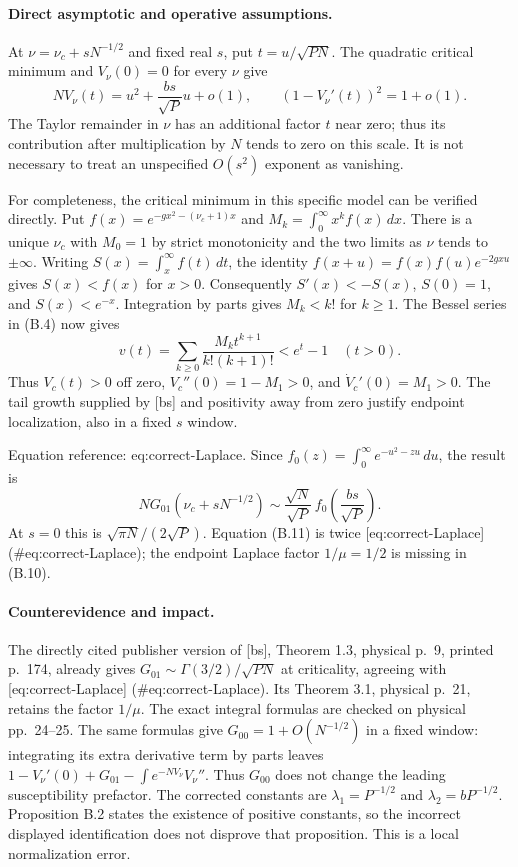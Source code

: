 \documentclass[10pt]{article}
\begin{document}
\paragraph*{Direct asymptotic and operative assumptions.}\mbox{}\par
At \(\nu=\nu_c+sN^{-1/2}\) and fixed real \(s\), put \(t=u/\sqrt{PN}\). The quadratic critical minimum and \(V_\nu(0)=0\) for every \(\nu\) give \[NV_\nu(t)=u^2+\frac{bs}{\sqrt P}u+o(1),\qquad
 (1-V_\nu'(t))^2=1+o(1).\] The Taylor remainder in \(\nu\) has an additional factor \(t\) near zero; thus its contribution after multiplication by \(N\) tends to zero on this scale. It is not necessary to treat an unspecified \(O(s^2)\) exponent as vanishing.\par
For completeness, the critical minimum in this specific model can be verified directly. Put \(f(x)=e^{-gx^2-(\nu_c+1)x}\) and \(M_k=\int_0^\infty x^k f(x)\,dx\). There is a unique \(\nu_c\) with \(M_0=1\) by strict monotonicity and the two limits as \(\nu\) tends to \(\pm\infty\). Writing \(S(x)=\int_x^\infty f(t)\,dt\), the identity \(f(x+u)=f(x)f(u)e^{-2gxu}\) gives \(S(x)<f(x)\) for \(x>0\). Consequently \(S'(x)<-S(x)\), \(S(0)=1\), and \(S(x)<e^{-x}\). Integration by parts gives \(M_k<k!\) for \(k\geq1\). The Bessel series in (B.4) now gives \[v(t)=\sum_{k\geq0}\frac{M_k t^{k+1}}{k!(k+1)!}<e^t-1
       \quad(t>0).\] Thus \(V_c(t)>0\) off zero, \(V_c''(0)=1-M_1>0\), and \(\dot V_c'(0)=M_1>0\). The tail growth supplied by [bs] and positivity away from zero justify endpoint localization, also in a fixed \(s\) window.\par
Equation reference: eq:correct-Laplace. Since \(f_0(z)=\int_0^\infty e^{-u^2-zu}\,du\), the result is \[
 NG_{01}(\nu_c+sN^{-1/2})
 \sim \frac{\sqrt N}{\sqrt P}\,
                 f_0\!\left(\frac{bs}{\sqrt P}\right).\] At \(s=0\) this is \(\sqrt{\pi N}/(2\sqrt P)\). Equation (B.11) is twice [eq:correct-Laplace] (\#eq:correct-Laplace); the endpoint Laplace factor \(1/\mu=1/2\) is missing in (B.10).\par
\paragraph*{Counterevidence and impact.}\mbox{}\par
The directly cited publisher version of [bs], Theorem 1.3, physical p. 9, printed p. 174, already gives \(G_{01}\sim\Gamma(3/2)/\sqrt{PN}\) at criticality, agreeing with [eq:correct-Laplace] (\#eq:correct-Laplace). Its Theorem 3.1, physical p. 21, retains the factor \(1/\mu\). The exact integral formulas are checked on physical pp. 24–25. The same formulas give \(G_{00}=1+O(N^{-1/2})\) in a fixed window: integrating its extra derivative term by parts leaves \(1-V_\nu'(0)+G_{01}-\int e^{-NV_\nu}V_\nu''\). Thus \(G_{00}\) does not change the leading susceptibility prefactor. The corrected constants are \(\lambda_1=P^{-1/2}\) and \(\lambda_2=bP^{-1/2}\). Proposition B.2 states the existence of positive constants, so the incorrect displayed identification does not disprove that proposition. This is a local normalization error.\par
\end{document}
